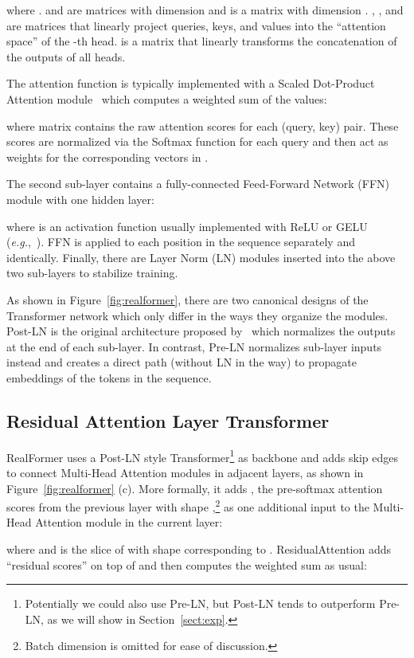 \documentclass[11pt,a4paper]{article}
\begin{document}
where .  and  are matrices with dimension  and  is a matrix with dimension . , , and  are matrices that linearly project queries, keys, and values into the ``attention space'' of the -th head.  is a matrix that linearly transforms the concatenation of the outputs of all heads.

The attention function is typically implemented with a Scaled Dot-Product Attention module~\citep{Vaswani-2017-attention} which computes a weighted sum of the values:

where matrix  contains the raw attention scores for each (query, key) pair. These scores are normalized via the Softmax function for each query and then act as weights for the corresponding vectors in .

The second sub-layer contains a fully-connected Feed-Forward Network (FFN) module with one hidden layer:

where  is an activation function usually implemented with ReLU or GELU (\emph{e.g.},~\citet{Devlin-2019-bert}). FFN is applied to each position in the sequence separately and identically.
Finally, there are Layer Norm (LN) modules inserted into the above two sub-layers to stabilize training.

As shown in Figure~\ref{fig:realformer}, there are two canonical designs of the Transformer network which only differ in the ways they organize the modules. Post-LN is the original architecture proposed by~\citet{Vaswani-2017-attention} which normalizes the outputs at the end of each sub-layer. In contrast, Pre-LN normalizes sub-layer inputs instead and creates a direct path (without LN in the way) to propagate embeddings of the tokens in the sequence.

\subsection{Residual Attention Layer Transformer} \label{sec:realformer}
RealFormer uses a Post-LN style Transformer\footnote{Potentially we could also use Pre-LN, but Post-LN tends to outperform Pre-LN, as we will show in Section~\ref{sect:exp}.}  as backbone and adds skip edges to connect Multi-Head Attention modules in adjacent layers, as shown in Figure~\ref{fig:realformer} (c). More formally, it adds , the pre-softmax attention scores from the previous layer with shape ,\footnote{Batch dimension is omitted for ease of discussion.} as one additional input to the Multi-Head Attention module in the current layer:

where   and  is the slice of  with shape  corresponding to .
ResidualAttention adds ``residual scores'' on top of  and then computes the weighted sum as usual:
\end{document}
